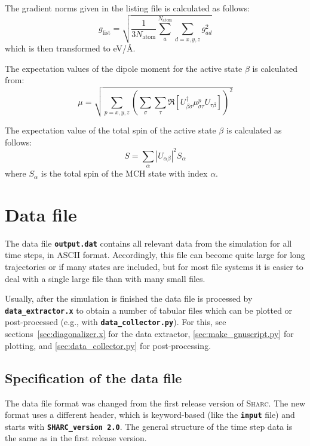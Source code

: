 \documentclass[a4paper,10pt,DIV=15,openany]{scrbook}
\newcommand{\sharc}{\textsc{Sharc}}
\newcommand{\ttt}[1]{\textbf{\texttt{#1}}}
\begin{document}
The gradient norms given in the listing file is calculated as follows:
\begin{equation}
  g_\text{list}=\sqrt{\frac{1}{3N_\text{atom}}\sum\limits_a^{N_\text{atom}}\sum_{d=x,y,z} g_{ad}^2}
\end{equation}
which is then transformed to eV/\AA.

The expectation values of the dipole moment for the active state $\beta$ is calculated from:
\begin{equation}
  \mu=\sqrt{\sum\limits_{p=x,y,z} 
  \left(
    \sum\limits_\sigma\sum\limits_\tau
    \Re\left[
      U_{\beta\sigma}^\dagger \mu_{\sigma\tau}^p U_{\tau\beta}
    \right]
  \right)^2}
\end{equation}

The expectation value of the total spin of the active state $\beta$ is calculated as follows:
\begin{equation}
  S=\sum_\alpha |U_{\alpha\beta}|^2 S_\alpha
\end{equation}
where $S_\alpha$ is the total spin of the MCH state with index $\alpha$.

\section{Data file}\label{sec:datfile}

The data file \ttt{output.dat} contains all relevant data from the simulation for all time steps, in ASCII format. Accordingly, this file can become quite large for long trajectories or if many states are included, but for most file systems it is easier to deal with a single large file than with many small files.

Usually, after the simulation is finished the data file is processed by \ttt{data\_extractor.x} to obtain a number of tabular files which can be plotted or post-processed (e.g., with \ttt{data\_collector.py}). For this, see sections~\ref{sec:diagonalizer.x} for the data extractor, \ref{sec:make_gnuscript.py} for plotting, and \ref{sec:data_collector.py} for post-processing.

\subsection{Specification of the data file}

The data file format was changed from the first release version of \sharc. The new format uses a different header, which is keyword-based (like the \ttt{input} file) and starts with \ttt{SHARC\_version 2.0}. The general structure of the time step data is the same as in the first release version.
\end{document}
